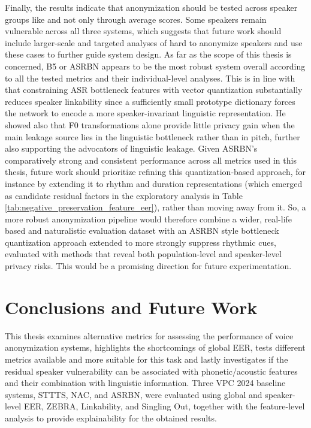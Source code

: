 \documentclass[12pt,leqno,a4paper]{article}
\begin{document}
Finally, the results indicate that anonymization should be tested across speaker groups like \cite{williams_anonymizing_2024} and not only through average scores. 
Some speakers remain vulnerable across all three systems, which suggests that future work should include larger-scale and targeted analyses of hard to anonymize 
speakers and use these cases to further guide system design. As far as the scope of this thesis is concerned, B5 or ASRBN appears to be the most robust system overall according to 
all the tested metrics and their individual-level analyses. This is in line with \citet{champion_anonymizing_2024} that constraining ASR bottleneck features with vector 
quantization substantially reduces speaker linkability since a sufficiently small prototype dictionary forces the network to encode a more
speaker-invariant linguistic representation. He showed also that F0 transformations alone provide little privacy gain when the main leakage source lies in the linguistic bottleneck rather
than in pitch, further also supporting the advocators of linguistic leakage. Given ASRBN's comparatively strong and consistent performance across all metrics used in this thesis, future work should prioritize refining this 
quantization-based approach, for instance by extending it to rhythm and duration representations (which emerged as candidate residual factors in the exploratory analysis in Table \ref{tab:negative_preservation_feature_eer}), rather than moving away from it. 
So, a more robust anonymization pipeline would therefore combine a wider, real-life based and naturalistic evaluation dataset with an ASRBN style bottleneck quantization approach extended to more strongly suppress rhythmic cues,
evaluated with methods that reveal both population-level and speaker-level privacy risks. This would be a promising direction for future experimentation.

\section{Conclusions and Future Work}
\label{sec:conclusions}

This thesis examines alternative metrics for assessing the performance of voice anonymization systems, highlights the shortcomings of global EER, tests different metrics available and more suitable for this task and 
lastly investigates if the residual speaker vulnerability can be associated with phonetic/acoustic features and their combination with linguistic information. 
Three VPC 2024 baseline systems, STTTS, NAC, and ASRBN, were evaluated using global and speaker-level EER, ZEBRA, Linkability, and Singling Out, together with the feature-level analysis to provide explainability for the obtained results.
\end{document}
